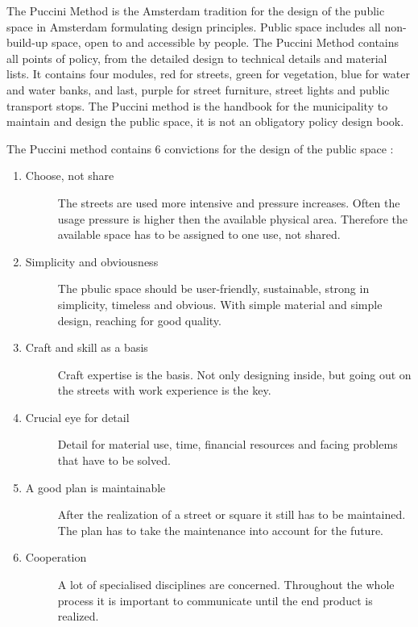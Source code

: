 The Puccini Method is the Amsterdam tradition for the design of the public space in Amsterdam formulating design principles. Public space includes all non-build-up space, open to and accessible by people. The Puccini Method contains all points of policy, from the detailed design to technical details and material lists. It contains four modules, red for streets, green for vegetation, blue for water and water banks, and last, purple for street furniture, street lights and public transport stops. 
The Puccini method is the handbook for the municipality to maintain and design the public space, it is not an obligatory policy design book.~\cite{puccini2014}

The Puccini method contains 6 convictions for the design of the public space :~\cite{puccini2014}
\begin{enumerate}
\item 	\begin{description}
		\item[Choose, not share] 
		The streets are used more intensive and pressure increases. Often the usage pressure is higher then the available physical area. Therefore the available space has to be assigned to one use, not shared. 
		\end{description}
\item \begin{description}
		\item[Simplicity and obviousness] 
		The pbulic space should be user-friendly, sustainable, strong in simplicity, timeless and obvious. With simple material and simple design, reaching for good quality.
		\end{description}
\item \begin{description}
		\item[Craft and skill as a basis] Craft expertise is the basis. Not only designing inside, but going out on the streets with work experience is the key. 
		\end{description}
\item \begin{description}
		\item[Crucial eye for detail] Detail for material use, time, financial resources and facing problems that have to be solved. 
		\end{description}
\item \begin{description}
		\item[A good plan is maintainable] After the realization of a street or square it still has to be maintained. The plan has to take the maintenance into account for the future. 
		\end{description}
\item \begin{description}
		\item[Cooperation] A lot of specialised disciplines are concerned. Throughout the whole process it is important to communicate until the end product is realized. 
		\end{description}
\end{enumerate}



